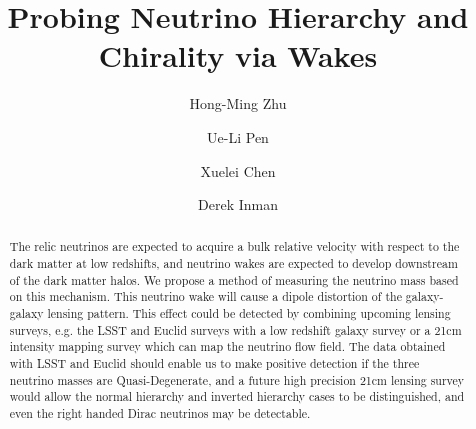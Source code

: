 \documentclass[aps,prl,twocolumn,showpacs,superscriptaddress,groupedaddress,nofootinbib]{revtex4}  %
\begin{document}
\widetext

\title{Probing Neutrino Hierarchy and Chirality via Wakes}

\author{Hong-Ming Zhu} 

\author{Ue-Li Pen} 

\author{Xuelei Chen}

\author{Derek Inman} 

\begin{abstract}
The relic neutrinos are expected to acquire a bulk relative velocity with 
respect to the dark matter at low redshifts, and neutrino wakes are expected to develop 
downstream of the dark matter halos.  We propose a method of 
measuring the neutrino mass based on this mechanism.  
This neutrino wake will cause a dipole distortion of the galaxy-galaxy
lensing pattern.  This effect could be detected by combining upcoming lensing 
surveys, e.g. the LSST and Euclid surveys with a low redshift galaxy survey or 
a 21cm intensity mapping survey which can map the neutrino flow 
field.  The data obtained with LSST and Euclid 
should enable us to make positive detection if the three
neutrino masses are Quasi-Degenerate, and a future high precision 
21cm lensing survey would allow the normal hierarchy and inverted 
hierarchy cases to be distinguished, 
and even the right handed Dirac neutrinos may be detectable.
\end{abstract}

\pacs{}
\maketitle
\end{document}
